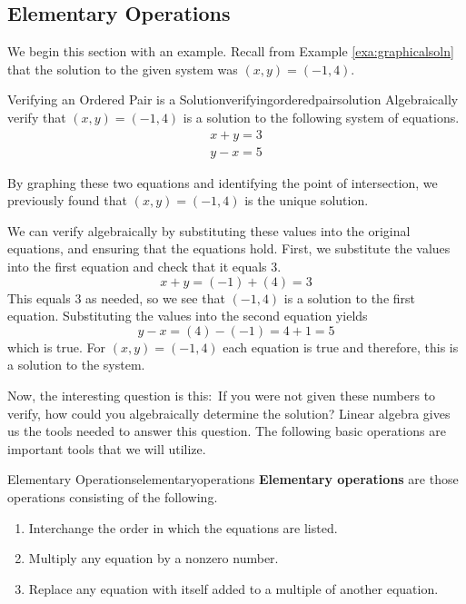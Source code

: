 \subsection{Elementary Operations}

We begin this section with an example. Recall from Example \ref{exa:graphicalsoln} that the solution to the given system was $\left(x, y \right) = \left( -1, 4 \right)$. 

\begin{example}{Verifying an Ordered Pair is a Solution}{verifyingorderedpairsolution}
Algebraically verify that $\left(x, y \right) = \left( -1, 4 \right)$ is a solution to the following system of equations.
\[
\begin{array}{c}
x+y=3 \\
y-x=5  
\end{array}
\]
\end{example}

\begin{solution} 
By graphing these two equations and identifying the point of
intersection, we previously found that $\left(x, y \right) = \left(
-1, 4 \right)$ is the unique solution.

We can verify algebraically by substituting these values
into the original equations, and ensuring that the equations hold. 
First, we substitute the values into the first equation and check that it equals $3$. 
\[
x + y = (-1)+(4) = 3
\]
This equals $3$ as needed, so we see that $\left( -1,4 \right)$ is a solution to the first equation. 
Substituting the values into the second equation yields
\[
y -x = (4) - (-1) = 4 + 1  = 5
\]
which is true.
For
$\left( x,y\right) =\left( -1,4\right) $ each equation is true and therefore, this is a solution to the system.
\end{solution}

Now, the interesting question is this:\ If you were not given
these numbers to verify, how could you algebraically determine the solution? Linear algebra gives us the tools needed to answer this
question. The following basic operations are important tools that we will  utilize.

\begin{definition}{Elementary Operations}{elementaryoperations}
\textbf{Elementary operations}  are those
operations consisting of the following.

\begin{enumerate}
\item Interchange the order in which the equations are listed.

\item Multiply any equation by a nonzero number.

\item Replace any equation with itself added to a multiple of another
equation.

\end{enumerate}
\end{definition}

